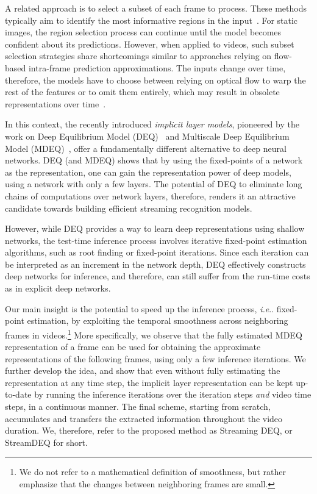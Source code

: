 \documentclass[runningheads]{llncs}
\makeatletter
\DeclareRobustCommand\onedot{\futurelet\@let@token\@onedot}
\def\@onedot{\ifx\@let@token.\else.\null\fi\xspace}
\def\ie{\emph{i.e}\onedot} \def\Ie{\emph{I.e}\onedot}
\makeatother
\begin{document}
A related approach is to select a subset of each frame to process. These methods typically aim to identify the most informative regions in the input~\cite{mnih2014ram,ba2015dram,cordonnier2021differentiable}. For static images, the region selection process can continue until the model becomes confident about its predictions. However, when applied to videos, such subset selection strategies share shortcomings similar to approaches relying on flow-based intra-frame prediction approximations. The inputs change over time, therefore, the models have to choose between relying on optical flow to warp the rest of the features or to omit them entirely, which may result in obsolete representations over time~\cite{zhu2018towards}.


In this context, the recently introduced {\em implicit layer models}, pioneered by the work on Deep Equilibrium Model (DEQ)~\cite{bai2019deq} and Multiscale Deep Equilibrium Model (MDEQ)~\cite{bai2020mdeq}, offer a fundamentally different alternative to deep neural networks. DEQ (and MDEQ) shows that by using the fixed-points of a network as the representation, one can gain the representation power of deep models, using a network with only a few layers. The potential of DEQ to eliminate long chains of computations over network layers, therefore, renders it an attractive candidate towards building efficient streaming recognition models. 


However, while DEQ provides a way to learn deep representations using shallow networks, the test-time inference process involves iterative fixed-point estimation algorithms, such as root finding or fixed-point iterations. Since each iteration can be interpreted as an increment in the network depth, DEQ effectively constructs deep networks for inference, and therefore, can still suffer from the run-time costs as in explicit deep networks. 
 
Our main insight is the potential to speed up the inference process, \ie fixed-point estimation, by exploiting the temporal smoothness across neighboring frames in videos.\footnote{We do not refer to a mathematical definition of smoothness, but rather emphasize that the changes between neighboring frames are small.} More specifically, we observe that the fully estimated MDEQ representation of a frame can be used for obtaining the approximate representations of the following frames, using only a few inference iterations. We further develop the idea, and show that even without fully estimating the representation at any time step, the implicit layer representation can be kept up-to-date by running the inference iterations over the iteration steps {\em and} video time steps, in a continuous manner. The final scheme, starting from scratch, accumulates and transfers the extracted information throughout the video duration. We, therefore, refer to the proposed method as Streaming DEQ, or StreamDEQ for short.
\end{document}
